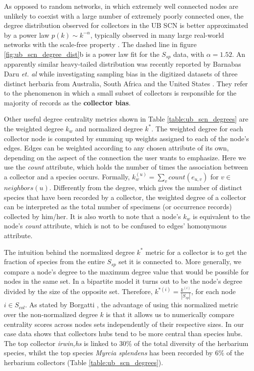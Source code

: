 As opposed to random networks, in which extremely well connected nodes are unlikely to coexist with a large number of extremely poorly connected ones, the degree distribution observed for collectors in the UB SCN is better approximated by a power law $p(k) \sim k^{-\alpha}$, typically observed in many large real-world networks with the scale-free property \cite{Barabasi1999a}. 
The dashed line in figure \ref{fig:ub_scn_degree_dist}b is a power law fit for the $S_{sp}$ data, with $\alpha=1.52$. 
An apparently similar heavy-tailed distribution was recently reported by Barnabas Daru \textit{et. al} while investigating sampling bias in the digitized datasets of three distinct herbaria from Australia, South Africa and the United States \cite{Daru2017}.
They refer to the phenomenon in which a small subset of collectors is responsible for the majority of records as the \textbf{collector bias}.
  
Other useful degree centrality metrics shown in Table \ref{table:ub_scn_degrees} are the weighted degree $k_w$ and normalized degree $k^*$. The weighted degree for each collector node is computed by summing up weights assigned to each of the node's edges. Edges can be weighted according to any chosen attribute of its own, depending on the aspect of the connection the user wants to emphasize. Here we use the \textit{count} attribute, which holds the number of times the association between a collector and a species occurs. Formally, $k_w^{(u)} = \sum_{v} count(e_{u,v})$ for $v \in$ $neighbors(u)$. Differently from the degree, which gives the number of distinct species that have been recorded by a collector, the weighted degree of a collector can be interpreted as the total number of specimens (or occurrence records) collected by him/her. It is also worth to note that a node's $k_w$ is equivalent to the node's \textit{count} attribute, which is not to be confused to edges' homonymous attribute.

The intuition behind the normalized degree $k^*$ metric for a collector is to get the fraction of species from the entire $S_{sp}$ set it is connected to. More generally, we compare a node's degree to the maximum degree value that would be possible for nodes in the same set. In a bipartite model it turns out to be the node's degree divided by the size of the opposite set. Therefore, $k^{*(i)} = \frac{k^{(i)}}{|S_{sp}|}$, for each node $i \in S_{col}$. 
As stated by Borgatti \cite{Borgatti2015}, the advantage of using this normalized metric over the non-normalized degree $k$ is that it allows us to numerically compare centrality scores across nodes sets independently of their respective sizes. 
In our case data shows that collectors hubs tend to be more central than species hubs. The top collector \textit{irwin,hs} is linked to $30\%$ of the total diversity of the herbarium species, whilst the top species \textit{Myrcia splendens} has been recorded by $6\%$ of the herbarium collectors (Table \ref{table:ub_scn_degrees}). 



